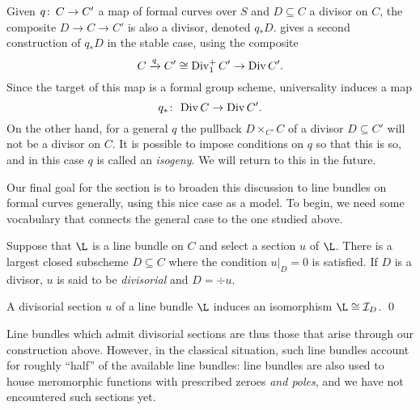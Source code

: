 \begin{remark}\label{DivHasPushforwards}
Given $q\colon\thinspace C \to C'$ a map of formal curves over $S$ and $D \subseteq C$ a divisor on $C$, the composite $D \to C \to C'$ is also a divisor, denoted $q_* D$.   gives a second construction of $q_* D$ in the stable case, using the composite \[C \xrightarrow{q} C' \cong \operatorname{Div}_1^+ C' \to \operatorname{Div} C'.\]  Since the target of this map is a formal group scheme, universality induces a map \[q_*\colon\thinspace \operatorname{Div} C \to \operatorname{Div} C'.\]  On the other hand, for a general $q$ the pullback $D \times_{C'} C$ of a divisor $D \subseteq C'$ will not be a divisor on $C$.  It is possible to impose conditions on $q$ so that this is so, and in this case $q$ is called an \textit{isogeny}.  We will return to this in the future.
\end{remark}

Our final goal for the section is to broaden this discussion to line bundles on formal curves generally, using this nice case as a model.  To begin, we need some vocabulary that connects the general case to the one studied above.

\begin{definition}
Suppose that $\L$ is a line bundle on $C$ and select a section $u$ of $\L$.  There is a largest closed subscheme $D \subseteq C$ where the condition $u|_D = 0$ is satisfied.  If $D$ is a divisor, $u$ is said to be \textit{divisorial} and $D = \div u$.
\end{definition}

\begin{lemma}
A divisorial section $u$ of a line bundle $\L$ induces an isomorphism $\L \cong \sheaf I_D$. \qed
\end{lemma}

Line bundles which admit divisorial sections are thus those that arise through our construction above.  However, in the classical situation, such line bundles account for roughly ``half'' of the available line bundles: line bundles are also used to house meromorphic functions with prescribed zeroes \emph{and poles}, and we have not encountered such sections yet.


